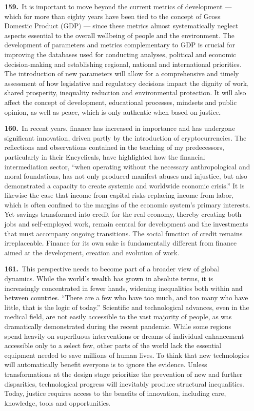 \documentclass{article}
\begin{document}
\textbf{159.}\ It is important to move beyond the current metrics of development --- which for more than eighty years have been tied to the concept of Gross Domestic Product (GDP) --- since these metrics almost systematically neglect aspects essential to the overall wellbeing of people and the environment. The development of parameters and metrics complementary to GDP is crucial for improving the databases used for conducting analyses, political and economic decision-making and establishing regional, national and international priorities. The introduction of new parameters will allow for a comprehensive and timely assessment of how legislative and regulatory decisions impact the dignity of work, shared prosperity, inequality reduction and environmental protection. It will also affect the concept of development, educational processes, mindsets and public opinion, as well as peace, which is only authentic when based on justice.

\textbf{160.}\ In recent years, finance has increased in importance and has undergone significant innovation, driven partly by the introduction of cryptocurrencies. The reflections and observations contained in the teaching of my predecessors, particularly in their Encyclicals, have highlighted how the financial intermediation sector, ``when operating without the necessary anthropological and moral foundations, has not only produced manifest abuses and injustice, but also demonstrated a capacity to create systemic and worldwide economic crisis.''\cite{n161} It is likewise the case that income from capital risks replacing income from labor, which is often confined to the margins of the economic system's primary interests. Yet savings transformed into credit for the real economy, thereby creating both jobs and self-employed work, remain central for development and the investments that must accompany ongoing transitions. The social function of credit remains irreplaceable. Finance for its own sake is fundamentally different from finance aimed at the development, creation and evolution of work.

\textbf{161.}\ This perspective needs to become part of a broader view of global dynamics. While the world's wealth has grown in absolute terms, it is increasingly concentrated in fewer hands, widening inequalities both within and between countries. ``There are a few who have too much, and too many who have little, that is the logic of today.''\cite{n162} Scientific and technological advances, even in the medical field, are not easily accessible to the vast majority of people, as was dramatically demonstrated during the recent pandemic. While some regions spend heavily on superfluous interventions or dreams of individual enhancement accessible only to a select few, other parts of the world lack the essential equipment needed to save millions of human lives. To think that new technologies will automatically benefit everyone is to ignore the evidence. Unless transformations at the design stage prioritize the prevention of new and further disparities, technological progress will inevitably produce structural inequalities. Today, justice requires access to the benefits of innovation, including care, knowledge, tools and opportunities.
\end{document}
